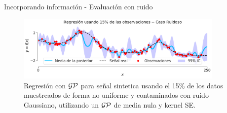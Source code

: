\documentclass[9pt]{beamer}
\begin{document}
 \begin{frame}{Incorporando información - Evaluación con ruido}
 \begin{figure}[H]
  \centering
  \includegraphics[width=0.9\textwidth]{../img/cap8_posterior_ruido}
  \caption{Regresión con $\mathcal{GP}$ para señal sintetica usando el 15$\%$ de los datos muestreados de forma no uniforme y contaminados con ruido Gaussiano, utilizando un $\mathcal{GP}$ de media nula y kernel SE.}
  \label{fig:gp_3}
\end{figure}

 \end{frame}



\begin{frame}
  \titlepage
\end{frame}




%
\end{document}
